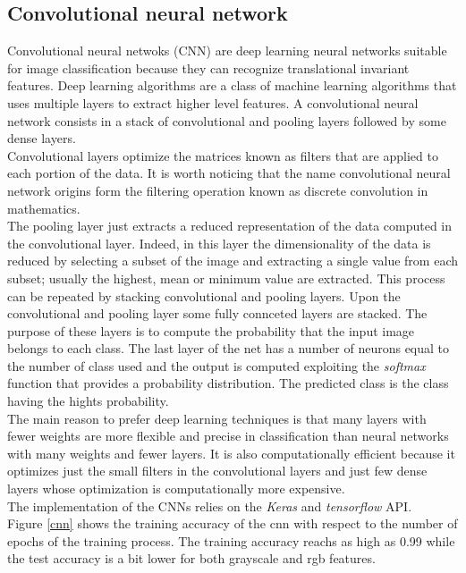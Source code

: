 \documentclass{article}
\begin{document}
\subsection{Convolutional neural network}
Convolutional neural netwoks (CNN) are deep learning neural networks suitable for image classification because they can recognize translational invariant features. Deep learning algorithms are a class of machine learning algorithms that uses multiple layers to extract higher level features. A convolutional neural network consists in a stack of convolutional and pooling layers followed by some dense layers. \\
Convolutional layers optimize the matrices known as filters that are applied to each portion of the data. It is worth noticing that the name convolutional neural network origins form the filtering operation known as discrete convolution in mathematics. \\ 
The pooling layer just extracts a reduced representation of the data computed in the convolutional layer. Indeed, in this layer the dimensionality of the data is reduced by selecting a subset of the image and extracting a single value from each subset; usually the highest, mean or minimum value are extracted. This process can be repeated by stacking convolutional and pooling layers. Upon the convolutional and pooling layer some fully connceted layers are stacked. The purpose of these layers is to compute the probability that the input image belongs to each class. The last layer of the net has a number of neurons equal to the number of class used and the output is computed exploiting the \textit{softmax} function that provides a probability distribution. The predicted class is the class having the hights probability. \\
The main reason to prefer deep learning techniques is that many layers with fewer weights are more flexible and precise in classification than neural networks with many weights and fewer layers. It is also computationally efficient because it optimizes just the small filters in the convolutional layers and just few dense layers whose optimization is computationally more expensive. \\
The implementation of the CNNs relies on the \textit{Keras} and \textit{tensorflow} API.\\
Figure \ref{cnn} shows the training accuracy of the cnn with respect to the number of epochs of the training process. The training accuracy reachs as high as 0.99 while the test accuracy is a bit lower for both grayscale and rgb features.
\end{document}
